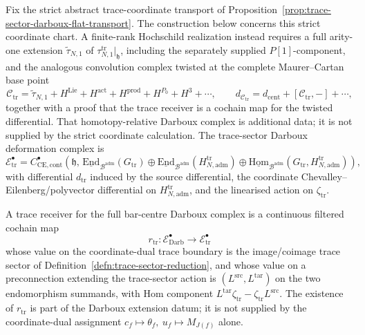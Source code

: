 \begin{defn}
\label{defn:relative-darboux-extension-obstruction}
Fix the strict abstract trace-coordinate transport of
Proposition~\ref{prop:trace-sector-darboux-flat-transport}.  The
construction below concerns this strict coordinate chart.  A
finite-rank Hochschild realization instead requires a full arity-one
extension \(\widetilde\tau_{N,1}\) of
\(\tau_{N,1}^{\mathrm{tr}}|_{\mathfrak h}\), including the separately
supplied \(P[1]\)-component, and the analogous convolution complex
twisted at the complete Maurer--Cartan base point
\[
  \mathcal C_{\mathrm{tr}}
    =\widetilde\tau_{N,1}
      +H^{\mathrm{Lie}}+H^{\mathrm{act}}
      +H^{\mathrm{prod}}+H^{P_0}+H^3+\cdots,
  \qquad
  d_{\mathcal C_{\mathrm{tr}}}
    =d_{\mathrm{cent}}+
      [\mathcal C_{\mathrm{tr}},-]+\cdots ,
\]
together with a proof that the trace receiver is a cochain map for the
twisted differential.  That homotopy-relative Darboux complex is
additional data; it is not supplied by the strict coordinate
calculation.  The
trace-sector Darboux deformation complex is
\[
  \mathcal E^\bullet_{\mathrm{tr}}
  =
  C^\bullet_{\mathrm{CE},\mathrm{cont}}\!\left(
  \mathfrak h,\,
  \underline{\mathrm{End}}_{\mathcal B^{\mathrm{adm}}}(G_{\mathrm{tr}})
  \oplus
  \underline{\mathrm{End}}_{\mathcal B^{\mathrm{adm}}}
    (H^{\mathrm{tr}}_{N,\mathrm{adm}})
  \oplus
  \underline{\mathrm{Hom}}_{\mathcal B^{\mathrm{adm}}}
    (G_{\mathrm{tr}},H^{\mathrm{tr}}_{N,\mathrm{adm}})
  \right),
\]
with differential \(d_{\mathrm{tr}}\) induced by the source differential,
the coordinate Chevalley--Eilenberg/polyvector differential on
\(H^{\mathrm{tr}}_{N,\mathrm{adm}}\), and
the linearised action on \(\zeta_{\mathrm{tr}}\).

A trace receiver for the full bar-centre Darboux complex is a continuous
filtered cochain map
\[
  r_{\mathrm{tr}}\colon
  \mathcal E^\bullet_{\mathrm{Darb}}
  \longrightarrow
  \mathcal E^\bullet_{\mathrm{tr}}
\]
whose value on the coordinate-dual trace boundary is the image/coimage trace sector
of Definition~\ref{defn:trace-sector-reduction}, and whose value on a
preconnection extending the trace-sector action is
\((L^{\mathrm{src}},L^{\mathrm{tar}})\) on the two endomorphism summands,
with Hom component
\(L^{\mathrm{tar}}\zeta_{\mathrm{tr}}
-\zeta_{\mathrm{tr}}L^{\mathrm{src}}\).  The existence of
\(r_{\mathrm{tr}}\) is part of the Darboux extension datum; it is not
supplied by the coordinate-dual assignment
\(c_f\mapsto\theta_f,\ u_f\mapsto M_{J(f)}\) alone.


\end{defn}
